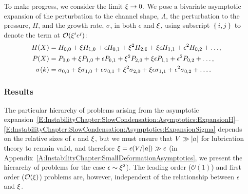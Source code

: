 To make progress, we consider the limit $\xi \to 0$. We pose a bivariate asymptotic expansion of the perturbation to the channel shape, $\Lambda$, the perturbation to the pressure, $\Pi$, and the growth rate, $\sigma$, in both $\epsilon$ and $\xi$, using subscript $\left\{i,j\right\}$ to denote the term at $\mathcal{O}(\xi^i \epsilon^j)$:
\begin{align}
H(X) &=    H_{0,0} + \xi H_{1,0} + \epsilon H_{0,1} +  \xi^2 H_{2,0} + \xi \epsilon H_{1,1} + \epsilon^2 H_{0,2} + \dots,\label{E:InstabilityChapter:SlowCondensation:Asymptotics:ExpansionH} \\
P(X) &=  P_{0,0} + \xi P_{1,0} + \epsilon P_{0,1} +  \xi^2P_{2,0} + \xi \epsilon P_{1,1} + \epsilon^2 P_{0,2}+\dots,\label{E:InstabilityChapter:SlowCondensation:Asymptotics:ExpansionP} \\
\sigma(k) &= \sigma_{0,0} + \xi \sigma_{1,0} + \epsilon \sigma_{0,1} +  \xi^2 \sigma_{2,0} + \xi \epsilon \sigma_{1,1} + \epsilon^2 \sigma_{0,2} + \dots. \label{E:InstabilityChapter:SlowCondensation:Asymptotics:ExpansionSigma}
\end{align}

\subsubsection{Results}
The particular hierarchy of problems arising from the asymptotic expansion~\eqref{E:InstabilityChapter:SlowCondensation:Asymptotics:ExpansionH}--\eqref{E:InstabilityChapter:SlowCondensation:Asymptotics:ExpansionSigma} depends on the relative sizes of $\epsilon$ and $\xi$, but we must ensure that $V \gg |a|$ for lubrication theory to remain valid, and therefore
$\xi  = \epsilon (V/|a|) \gg \epsilon$ (in Appendix~\ref{A:InstabilityChapter:SmallDeformationAsymptotics}, we present the hierarchy of problems for the case $\epsilon \sim \xi^2$). The leading order ($\mathcal{O}(1)$) and first order ($\mathcal{O}(\xi)$) problems are, however, independent of the relationship between $\epsilon$ and $\xi$.


